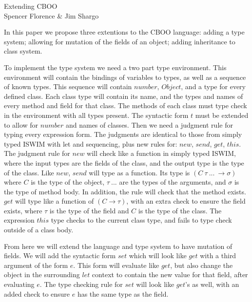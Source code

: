 \documentclass[]{letter}
\begin{document}
\begin{center}
  Extending CBOO\\
  Spencer Florence \& Jim Shargo
\end{center}

In this paper we propose three extentions to the CBOO language: adding a type system; allowing for mutation of the fields of an object; adding inheritance to class system.


To implement the type system we need a two part type environment.
This environment will contain the bindings of variables to types, as well as a sequence of known types.
This sequence will contain $number$, $Object$, and a type for every defined class.
Each class type will contain its name, and the types and names of every method and field for that class.
The methods of each class must type check in the environment with all types present.
The syntactic form $t$ must be extended to allow for $number$ and names of classes.
Then we need a judgment rule for typing every expression form.
The judgments are identical to those from simply typed ISWIM with let and sequencing, plus new rules for: $new$, $send$, $get$, $this$.
The judgment rule for $new$ will check like a function in simply typed ISWIM, where the input types are the fields of the class, and the output type is the type of the class.
Like $new$, $send$ will type as a function.
Its type is $(C\ \tau\ ...\ \to \sigma)$ where $C$ is the type of the object, $\tau\ ...$ are the types of the arguments, and $\sigma$ is the type of method body.
In addition, the rule will check that the method exists.
$get$ will type like a function of $(C \to \tau)$, with an extra check to ensure the field exists, where $\tau$ is the type of the field and $C$ is the type of the class. %
The expression $this$ type checks to the current class type, and fails to type check outside of a class body.

From here we will extend the language and type system to have mutation of fields.
We will add the syntactic form $set$ which will look like $get$ with a third argument of the form $e$.
This form will evaluate like $get$, but also change the object in the surrounding $let$ context to contain the new value for that field, after evaluating $e$.
The type checking rule for $set$ will look like $get$'s as well, with an added check to ensure $e$ has the same type as the field.
\end{document}
